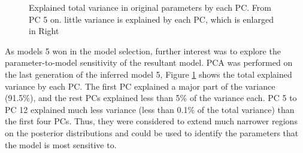 \begin{figure}[H]
    \begin{center}
    \end{center}

    \caption[Explained total variance in original parameters by each PC]{Explained total variance in original parameters by each PC. From PC 5 on. little variance is explained by each PC, which is enlarged in Right}
    \label{fig:pc}
\end{figure}

As models 5 won in the model selection, further interest was to explore the parameter-to-model sensitivity of the resultant model. PCA was performed on the last generation of the inferred model 5, Figure \ref{fig:pc} shows the total explained variance by each PC. The first PC explained a major part of the variance (91.5\%), and the rest PCs explained less than 5\% of the variance each. PC 5 to PC 12 explained much less variance (less than 0.1\% of the total variance) than the first four PCs. Thus, they were considered to extend much narrower regions on the posterior distributions and could be used to identify the parameters that the model is most sensitive to.

